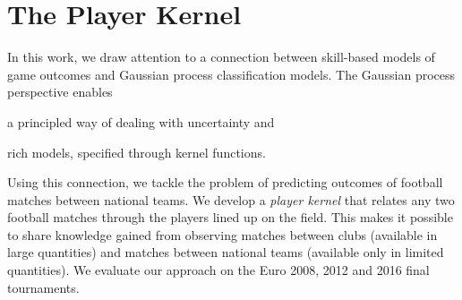 \chapter{The Player Kernel}

In this work, we draw attention to a connection between skill-based models of game outcomes and Gaussian process classification models.
The Gaussian process perspective enables
\begin{enuminline}
\item a principled way of dealing with uncertainty and
\item rich models, specified through kernel functions.
\end{enuminline}
Using this connection, we tackle the problem of predicting outcomes of football matches between national teams.
We develop a \emph{player kernel} that relates any two football matches through the players lined up on the field.
This makes it possible to share knowledge gained from observing matches between clubs (available in large quantities) and matches between national teams (available only in limited quantities).
We evaluate our approach on the Euro 2008, 2012 and 2016 final tournaments.





